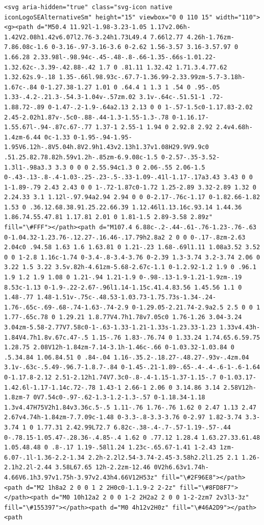 \documentclass[11pt]{article}
\begin{document}
\begin{Verbatim}[commandchars=\\\{\}]
           <svg aria-hidden="true" class="svg-icon native iconLogoSEAlternativeSm" height="15" viewbox="0 0 110 15" width="110"><g><path d="M50.4 11.92l-1.98-3.23-1.05 1.17v2.06h-1.42V2.08h1.42v6.07l2.76-3.24h1.73L49.4 7.66l2.77 4.26h-1.76zm-7.86.08c-1.6 0-3.16-.97-3.16-3.6 0-2.62 1.56-3.57 3.16-3.57.97 0 1.66.28 2.33.98l-.98.94c-.45-.48-.8-.66-1.35-.66s-1.01.22-1.32.62c-.3.39-.42.88-.42 1.7 0 .81.11 1.32.42 1.71.3.4.77.62 1.32.62s.9-.18 1.35-.66l.98.93c-.67.7-1.36.99-2.33.99zm-5.7-3.18h-1.67c-.84 0-1.27.38-1.27 1.01 0 .64.4 1 1.3 1 .54 0 .95-.05 1.33-.4.2-.21.3-.54.3-1.04v-.57zm.02 3.1v-.64c-.51.51-1 .72-1.88.72-.89 0-1.47-.2-1.9-.64a2.13 2.13 0 0 1-.57-1.5c0-1.17.83-2.02 2.45-2.02h1.87v-.5c0-.88-.44-1.3-1.55-1.3-.78 0-1.16.17-1.55.67l-.94-.87c.67-.77 1.37-1 2.55-1 1.94 0 2.92.8 2.92 2.4v4.68h-1.4zm-6.44 0c-1.33 0-1.95-.94-1.95-1.95V6.12h-.8V5.04h.8V2.9h1.43v2.13h1.37v1.08H29.9V9.9c0 .51.25.82.78.82h.59v1.2h-.85zm-6.9.08c-1.5 0-2.57-.35-3.52-1.3l1-.98a3.3 3.3 0 0 0 2.55.94c1.3 0 2.06-.55 2.06-1.5 0-.43-.13-.8-.4-1.03-.25-.23-.5-.33-1.09-.41l-1.17-.17a3.43 3.43 0 0 1-1.89-.79 2.43 2.43 0 0 1-.72-1.87c0-1.72 1.25-2.89 3.32-2.89 1.32 0 2.24.33 3.1 1.12l-.97.94a2.94 2.94 0 0 0-2.17-.76c-1.17 0-1.82.66-1.82 1.53 0 .36.12.68.38.91.25.22.66.39 1.12.46l1.13.16c.93.14 1.44.36 1.86.74.55.47.81 1.17.81 2.01 0 1.81-1.5 2.89-3.58 2.89z" fill="\#FFF"></path><path d="M107.4 6.88c-.2-.44-.61-.76-1.23-.76-.63 0-1.04.32-1.23.76-.12.27-.16.46-.17.79h2.8a2 2 0 0 0-.17-.8zm-2.63 2.04c0 .94.58 1.63 1.6 1.63.81 0 1.21-.23 1.68-.69l1.11 1.08a3.52 3.52 0 0 1-2.8 1.16c-1.74 0-3.4-.8-3.4-3.76 0-2.39 1.3-3.74 3.2-3.74 2.06 0 3.22 1.5 3.22 3.5v.82h-4.61zm-5.68-2.67c-1.1 0-1.2.92-1.2 1.9 0 .96.1 1.9 1.2 1.9 1.08 0 1.21-.94 1.21-1.9 0-.98-.13-1.9-1.21-1.9zm-.19 8.53c-1.13 0-1.9-.22-2.67-.96l1.14-1.15c.41.4.83.56 1.45.56 1.1 0 1.48-.77 1.48-1.51v-.75c-.48.53-1.03.73-1.75.73s-1.34-.24-1.76-.65c-.69-.68-.74-1.63-.74-2.9 0-1.29.05-2.21.74-2.9a2.5 2.5 0 0 1 1.77-.65c.78 0 1.29.21 1.8.77V4.7h1.78v7.05c0 1.76-1.26 3.04-3.24 3.04zm-5.58-2.77V7.58c0-1-.63-1.33-1.21-1.33s-1.23.33-1.23 1.33v4.43h-1.84V4.7h1.8v.67c.47-.5 1.15-.76 1.83-.76.74 0 1.33.24 1.74.65.6.59.75 1.28.75 2.08V12h-1.84zm-7.14-3.1h-1.46c-.66 0-1.03.32-1.03.84 0 .5.34.84 1.06.84.51 0 .84-.04 1.16-.35.2-.18.27-.48.27-.93v-.4zm.04 3.1v-.63c-.5.49-.96.7-1.8.7-.84 0-1.45-.21-1.89-.65-.4-.4-.6-1-.6-1.64 0-1.17.8-2.12 2.51-2.12h1.74V7.3c0-.8-.4-1.15-1.37-1.15-.7 0-1.03.17-1.42.6l-1.17-1.14c.72-.78 1.43-1 2.66-1 2.06 0 3.14.86 3.14 2.58V12h-1.8zm-7 0V7.54c0-.97-.62-1.3-1.2-1.3-.57 0-1.18.34-1.18 1.3v4.47H75V2h1.84v3.36c.5-.5 1.11-.76 1.76-.76 1.62 0 2.47 1.13 2.47 2.67v4.74h-1.84zm-7.7.09c-1.48 0-3.3-.8-3.3-3.76 0-2.97 1.82-3.74 3.3-3.74 1 0 1.77.31 2.42.99L72.7 6.82c-.38-.4-.7-.57-1.19-.57-.44 0-.78.15-1.05.47-.28.36-.4.85-.4 1.62 0 .77.12 1.28.4 1.63.27.33.61.48 1.05.48.48 0 .8-.17 1.19-.58l1.24 1.23c-.65.67-1.41 1-2.43 1zm-6.07-.1l-1.36-2.2-1.34 2.2h-2.2l2.54-3.74-2.45-3.58h2.2l1.25 2.1 1.26-2.1h2.2l-2.44 3.58L67.65 12h-2.2zm-12.46 0V2h6.63v1.74h-4.66V6.1h3.97v1.75h-3.97v2.43h4.66V12H53z" fill="\#2F96E8"></path><path d="M2 1h8a2 2 0 0 1 2 2H0c0-1.1.9-2 2-2z" fill="\#8FD8F7"></path><path d="M0 10h12a2 2 0 0 1-2 2H2a2 2 0 0 1-2-2zm7 2v3l3-3z" fill="\#155397"></path><path d="M0 4h12v2H0z" fill="\#46A2D9"></path><path 
\end{Verbatim}
\end{document}
